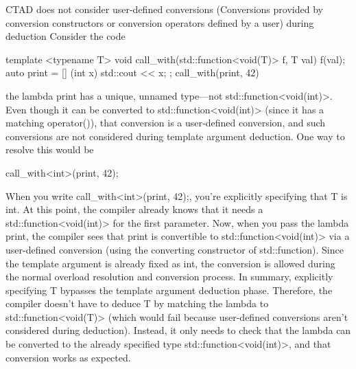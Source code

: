 \documentclass{report}
\begin{document}
\pagebreak 
{}
\bigbreak \noindent 
CTAD does not consider user-defined conversions (Conversions provided by conversion constructors or conversion operators defined by a user) during deduction
\bigbreak \noindent 
Consider the code
\bigbreak \noindent 
\begin{cppcode}
template <typename T>
void call_with(std::function<void(T)> f, T val) {
    f(val);
}
auto print = [] (int x) { std::cout << x; };
call_with(print, 42)
\end{cppcode}
\bigbreak \noindent 
the lambda print has a unique, unnamed type—not std::function<void(int)>. Even though it can be converted to std::function<void(int)> (since it has a matching operator()), that conversion is a user‐defined conversion, and such conversions are not considered during template argument deduction.
\bigbreak \noindent 
One way to resolve this would be 
\begin{cppcode}
    call_with<int>(print, 42);
\end{cppcode}
\bigbreak \noindent 
When you write call\_with<int>(print, 42);, you're explicitly specifying that T is int.
\bigbreak \noindent 
At this point, the compiler already knows that it needs a std::function<void(int)> for the first parameter. Now, when you pass the lambda print, the compiler sees that print is convertible to std::function<void(int)> via a user-defined conversion (using the converting constructor of std::function). Since the template argument is already fixed as int, the conversion is allowed during the normal overload resolution and conversion process.
\bigbreak \noindent 
In summary, explicitly specifying T bypasses the template argument deduction phase. Therefore, the compiler doesn't have to deduce T by matching the lambda to std::function<void(T)> (which would fail because user-defined conversions aren't considered during deduction). Instead, it only needs to check that the lambda can be converted to the already specified type std::function<void(int)>, and that conversion works as expected.
\end{document}
